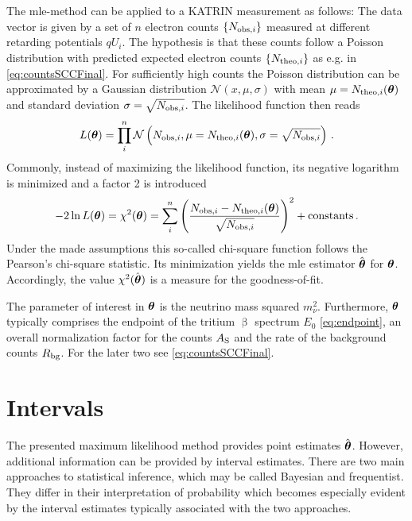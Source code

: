The \gls{mle}-method can be applied to a KATRIN measurement as follows: The data vector is given by a set of $n$ electron counts $\left\{N_{\mathrm{obs,}i}\right\}$ measured at different retarding potentials $qU_i$. The hypothesis is that these counts follow a Poisson distribution with predicted expected electron counts $\left\{N_{\mathrm{theo,}i}\right\}$ as e.g. in \eqref{eq:countsSCCFinal}. For sufficiently high counts the Poisson distribution can be approximated by a Gaussian distribution $\mathcal{N}(x,\mu, \sigma)$ with mean $\mu=N_{\mathrm{theo,}i}(\boldsymbol{\mathbf{\theta}})$ and standard deviation $\sigma=\sqrt{N_{\mathrm{obs,}i}}$. The likelihood function then reads
\begin{equation}
	\label{eq:KATRINlikelihood}
	L(\boldsymbol{\mathbf{\theta}}) = \prod_{i}^{n} \mathcal{N}\left(N_{\mathrm{obs,}i},\mu=N_{\mathrm{theo,}i}(\boldsymbol{\mathbf{\theta}}), \sigma=\sqrt{N_{\mathrm{obs,}i}}\right)
	\text{\,.}
\end{equation}
Commonly, instead of maximizing the likelihood function, its negative logarithm is minimized and a factor 2 is introduced
\begin{equation}
	\label{eq:katrinChi2}
	-2\ln L(\boldsymbol{\mathbf{\theta}}) = \chi^2(\boldsymbol{\mathbf{\theta}}) = \sum_i^n
		\left( 
			\frac{N_{\mathrm{obs,}i}-N_{\mathrm{theo,}i}(\boldsymbol{\mathbf{\theta}})}{\sqrt{N_{\mathrm{obs,}i}}}
		\right)^2
		 + \mathrm{constants}
		\text{\,.}
\end{equation}
Under the made assumptions this so-called chi-square function follows the Pearson's chi-square statistic. Its minimization yields the \gls{mle} estimator $\hat{\boldsymbol{\mathbf{\theta}}}$ for $\boldsymbol{\mathbf{\theta}}$. Accordingly, the value $\chi^2(\hat{\boldsymbol{\mathbf{\theta}}})$ is a measure for the goodness-of-fit.

The parameter of interest in $\boldsymbol{\mathbf{\theta}}$ is the neutrino mass squared $m_\nu^2$. Furthermore, $\boldsymbol{\mathbf{\theta}}$ typically comprises the endpoint of the tritium $\upbeta$ spectrum $E_0$ \eqref{eq:endpoint}, an overall normalization factor for the counts $A_\mathrm{S}$ and the rate of the background counts $R_\mathrm{bg}$. For the later two see \eqref{eq:countsSCCFinal}.

\section{Intervals}
The presented maximum likelihood method provides point estimates $\hat{\boldsymbol{\mathbf{\theta}}}$. However, additional information can be provided by interval estimates. There are two main approaches to statistical inference, which may be called Bayesian and frequentist. They differ in their interpretation of probability which becomes especially evident by the interval estimates typically associated with the two approaches.

